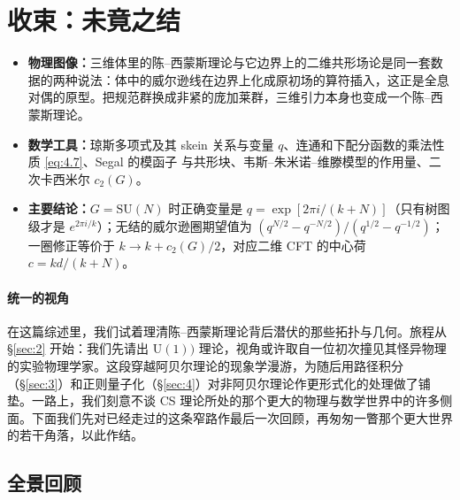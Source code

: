\documentclass[11pt,a4paper]{article}
\newcounter{yizhu}
\newif\ifshowkey
\newenvironment{keytakeaways}{%
    \par\medskip
    \ifshowkey
    \begin{tcolorbox}[enhanced,
        colback=blue!3!white, colframe=blue!35!black,
        boxrule=0.5pt, arc=2pt, left=6pt, right=6pt, top=4pt, bottom=4pt,
        title={\small\textbf{本节重点}\quad{\footnotesize（译者所加）}},
        fonttitle=\bfseries, coltitle=black, colbacktitle=blue!10!white,
        toptitle=1pt, bottomtitle=1pt]
    \else
        \setbox\yizhubox\vbox\bgroup
    \fi
}{%
    \ifshowkey
        \end{tcolorbox}%
    \else
        \egroup
    \fi
    \par\medskip
}
\begin{document}

\section{收束：未竟之结}\label{sec:5}

\begin{keytakeaways}
\begin{itemize}[leftmargin=1.4em,itemsep=2pt,topsep=2pt]
  \item \textbf{物理图像：}三维体里的陈--西蒙斯理论与它边界上的二维共形场论是同一套数据的两种说法：体中的威尔逊线在边界上化成原初场的算符插入，这正是全息对偶的原型。把规范群换成非紧的庞加莱群，三维引力本身也变成一个陈--西蒙斯理论。
  \item \textbf{数学工具：}琼斯多项式及其 skein 关系与变量 $q$、连通和下配分函数的乘法性质 \eqref{eq:4.7}、Segal 的模函子 \cite{segal} 与共形块、韦斯--朱米诺--维滕模型的作用量、二次卡西米尔 $c_2(G)$。
  \item \textbf{主要结论：}$G=\mathrm{SU}(N)$ 时正确变量是 $q=\exp[2\pi i/(k+N)]$（只有树图级才是 $e^{2\pi i/k}$）；无结的威尔逊圈期望值为 $(q^{N/2}-q^{-N/2})/(q^{1/2}-q^{-1/2})$；一圈修正等价于 $k\to k+c_2(G)/2$，对应二维 CFT 的中心荷 $c=kd/(k+N)$。
\end{itemize}
\end{keytakeaways}

\paragraph{统一的视角}
在这篇综述里，我们试着理清陈--西蒙斯理论背后潜伏的那些拓扑与几何。旅程从 \S\ref{sec:2} 开始：我们先请出 $\mathrm{U}(1))$ 理论，视角或许取自一位初次撞见其怪异物理的实验物理学家。这段穿越阿贝尔理论的现象学漫游，为随后用路径积分（\S\ref{sec:3}）和正则量子化（\S\ref{sec:4}）对非阿贝尔理论作更形式化的处理做了铺垫。一路上，我们刻意不谈 CS 理论所处的那个更大的物理与数学世界中的许多侧面。下面我们先对已经走过的这条窄路作最后一次回顾，再匆匆一瞥那个更大世界的若干角落，以此作结。

\subsection{全景回顾}\label{sec:5.1}
\end{document}
